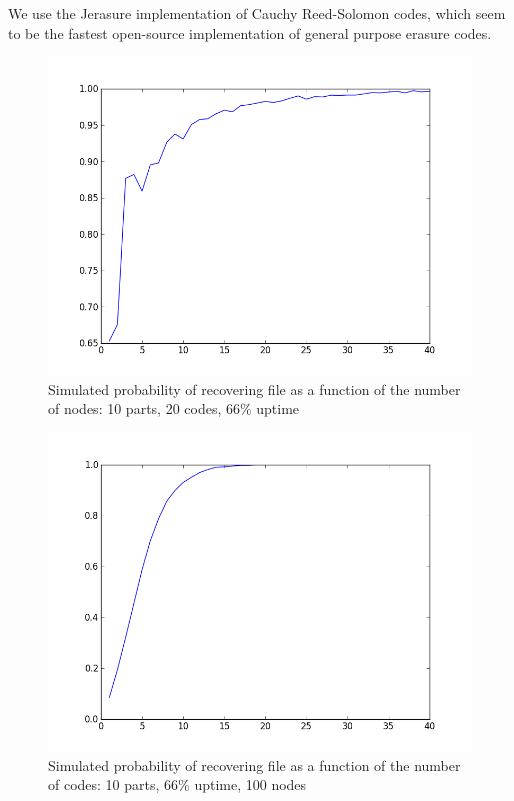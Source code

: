 \documentclass[11pt]{IEEEtran}
\begin{document}
We use the Jerasure implementation of Cauchy Reed-Solomon codes, which seem to be the fastest open-source implementation of general purpose erasure codes\cite{comparison_reed_solomon}. 

\begin{figure}
\centering
\includegraphics[scale=0.43]{test.png}
\caption{Simulated probability of recovering file as a function of the number of nodes: 10 parts, 20 codes, 66\% uptime}
\end{figure}
\begin{figure}
\centering
\includegraphics[scale=0.43]{test2.png}
\caption{Simulated probability of recovering file as a function of the number of codes: 10 parts, 66\% uptime, 100 nodes}
\end{figure}
\end{document}
